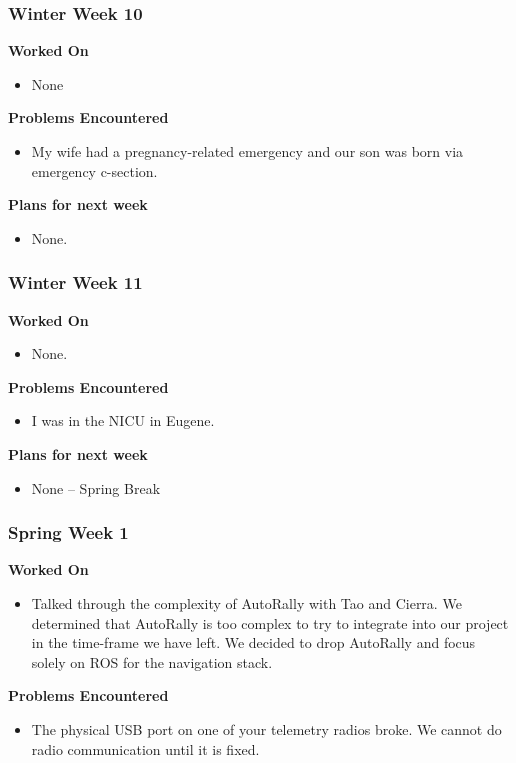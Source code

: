 \documentclass[compsoc,draftclsnofoot,onecolumn,10pt]{IEEEtran}
\begin{document}
\subsubsection*{Winter Week 10}
\textbf{Worked On}
\begin{itemize}
    \item None
\end{itemize}

\textbf{Problems Encountered}
\begin{itemize}
    \item My wife had a pregnancy-related emergency and our son was born via emergency c-section.
\end{itemize}

\textbf{Plans for next week}
\begin{itemize}
    \item None.
\end{itemize}


\subsubsection*{Winter Week 11}
\textbf{Worked On}
\begin{itemize}
    \item None.
\end{itemize}

\textbf{Problems Encountered}
\begin{itemize}
    \item I was in the NICU in Eugene.
\end{itemize}

\textbf{Plans for next week}
\begin{itemize}
    \item None -- Spring Break
\end{itemize}


\subsubsection*{Spring Week 1}
\textbf{Worked On}
\begin{itemize}
    \item Talked through the complexity of AutoRally with Tao and Cierra. We determined that AutoRally is too complex to try to integrate into our project in the time-frame we have left. We decided to drop AutoRally and focus solely on ROS for the navigation stack.
\end{itemize}

\textbf{Problems Encountered}
\begin{itemize}
    \item The physical USB port on one of your telemetry radios broke. We cannot do radio communication until it is fixed.
\end{itemize}
\end{document}
